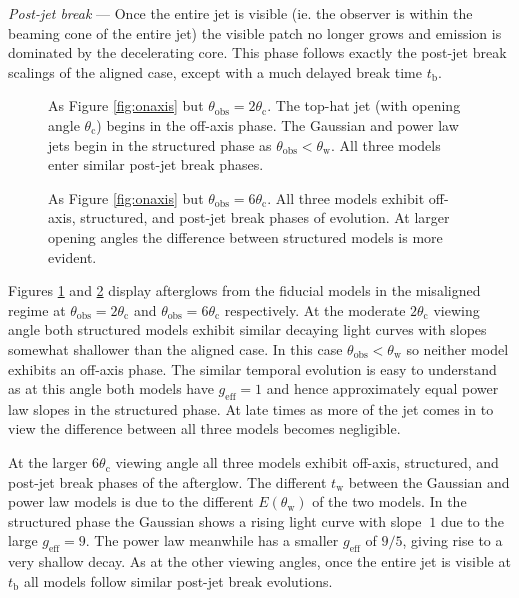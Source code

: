 \documentclass[twocolumn]{aastex62}
\newcommand{\tW}{\ensuremath{t_{\mathrm{w}}}}
\newcommand{\tb}{\ensuremath{t_{\mathrm{b}}}}
\newcommand{\thobs}{\ensuremath{\theta_{\mathrm{obs}}}}
\newcommand{\thW}{\ensuremath{\theta_{\mathrm{w}}}}
\newcommand{\thC}{\ensuremath{\theta_{\mathrm{c}}}}
\newcommand{\geff}{\ensuremath{g_{\mathrm{eff}}}}
\begin{document}
\emph{Post-jet break} --- Once the entire jet is visible (ie. the observer is within the beaming cone of the entire jet) the visible patch no longer grows and emission is dominated by the decelerating core.  This phase follows exactly the post-jet break scalings of the aligned case, except with a much delayed break time $\tb$.

\begin{figure}
	\caption{As Figure \ref{fig:onaxis} but $\thobs = 2\thC$.  The top-hat jet (with opening angle $\thC$) begins in the off-axis phase.  The Gaussian and power law jets begin in the structured phase as $\thobs < \thW$.  All three models enter similar post-jet break phases. \label{fig:offaxis1}}
\end{figure}
\begin{figure}
	\caption{As Figure \ref{fig:onaxis} but $\thobs = 6\thC$. All three models exhibit off-axis, structured, and post-jet break phases of evolution.  At larger opening angles the difference between structured models is more evident.  \label{fig:offaxis2}}
\end{figure}

Figures \ref{fig:offaxis1} and \ref{fig:offaxis2} display afterglows from the fiducial models in the misaligned regime at $\thobs = 2\thC$ and $\thobs=6\thC$ respectively.  At the moderate $2\thC$ viewing angle both structured models exhibit similar decaying light curves with slopes somewhat shallower than the aligned case. In this case $\thobs < \thW$ so neither model exhibits an off-axis phase.  The similar temporal evolution is easy to understand as at this angle both models have $\geff = 1$ and hence approximately equal power law slopes in the structured phase.  At late times as more of the jet comes in to view the difference between all three models becomes negligible. 

At the larger $6\thC$ viewing angle all three models exhibit off-axis, structured, and post-jet break phases of the afterglow.  The different $\tW$ between the Gaussian and power law models is due to the different $E(\thW)$ of the two models. In the structured phase the Gaussian shows a rising light curve with slope $~1$ due to the large $\geff = 9$.  The power law meanwhile has a smaller $\geff$ of $9/5$, giving rise to a very shallow decay. As at the other viewing angles, once the entire jet is visible at $\tb$ all models follow similar post-jet break evolutions.

%
%
\end{document}
